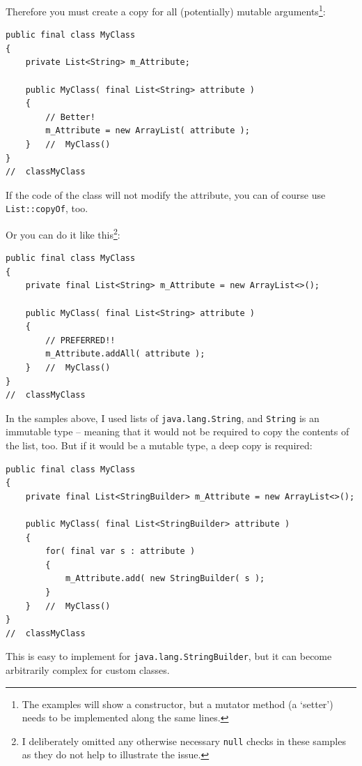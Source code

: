 Therefore you must create a copy for all (potentially) mutable arguments\footnote{The examples will show a constructor, but a mutator method (a ‘setter’) needs to be implemented along the same lines.}:
\begin{lstlisting}
public final class MyClass
{
    private List<String> m_Attribute;
    
    public MyClass( final List<String> attribute )
    {
    	// Better!
        m_Attribute = new ArrayList( attribute );
    }   //  MyClass()
}
//  classMyClass
\end{lstlisting}
If the code of the class will not modify the attribute, you can of course use \lstinline|List::copyOf|\autocite{ORACLE_DOC_LIST:copyOf}, too.

Or you can do it like this\footnote{I deliberately omitted any otherwise necessary \lstinline|null| checks in these samples as they do not help to illustrate the issue.}:
\begin{lstlisting}
public final class MyClass
{
    private final List<String> m_Attribute = new ArrayList<>();
    
    public MyClass( final List<String> attribute )
    {
        // PREFERRED!!
        m_Attribute.addAll( attribute );
    }   //  MyClass()
}
//  classMyClass
\end{lstlisting}
In the samples above, I used lists of \lstinline|java.lang.String|, and \lstinline|String| is an immutable type – meaning that it would not be required to copy the contents of the list, too. But if it would be a mutable type, a deep copy is required:
\begin{lstlisting}
public final class MyClass
{
    private final List<StringBuilder> m_Attribute = new ArrayList<>();
    
    public MyClass( final List<StringBuilder> attribute )
    {
        for( final var s : attribute )
        {
            m_Attribute.add( new StringBuilder( s );
        }    	
    }   //  MyClass()
}
//  classMyClass
\end{lstlisting}
This is easy to implement for \lstinline|java.lang.StringBuilder|, but it can become arbitrarily complex for custom classes.


